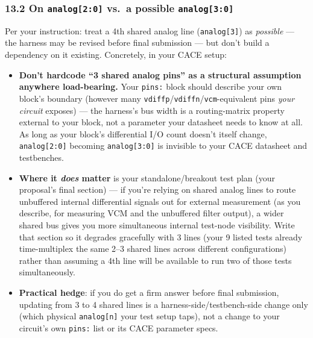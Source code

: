 \documentclass[
]{article}
\providecommand{\tightlist}{%
  \setlength{\itemsep}{0pt}\setlength{\parskip}{0pt}}
\begin{document}
\hypertarget{on-analog20-vs.-a-possible-analog30}{%
\subsubsection{\texorpdfstring{13.2 On \texttt{analog{[}2:0{]}} vs.~a
possible
\texttt{analog{[}3:0{]}}}{13.2 On analog{[}2:0{]} vs.~a possible analog{[}3:0{]}}}\label{on-analog20-vs.-a-possible-analog30}}

Per your instruction: treat a 4th shared analog line
(\texttt{analog{[}3{]}}) as \emph{possible} --- the harness may be
revised before final submission --- but don't build a dependency on it
existing. Concretely, in your CACE setup:

\begin{itemize}
\tightlist
\item
  \textbf{Don't hardcode ``3 shared analog pins'' as a structural
  assumption anywhere load-bearing.} Your \texttt{pins:} block should
  describe your own block's boundary (however many
  \texttt{vdiffp}/\texttt{vdiffn}/\texttt{vcm}-equivalent pins
  \emph{your circuit} exposes) --- the harness's bus width is a
  routing-matrix property external to your block, not a parameter your
  datasheet needs to know at all. As long as your block's differential
  I/O count doesn't itself change, \texttt{analog{[}2:0{]}} becoming
  \texttt{analog{[}3:0{]}} is invisible to your CACE datasheet and
  testbenches.
\item
  \textbf{Where it \emph{does} matter} is your standalone/breakout test
  plan (your proposal's final section) --- if you're relying on shared
  analog lines to route unbuffered internal differential signals out for
  external measurement (as you describe, for measuring VCM and the
  unbuffered filter output), a wider shared bus gives you more
  simultaneous internal test-node visibility. Write that section so it
  degrades gracefully with 3 lines (your 9 listed tests already
  time-multiplex the same 2--3 shared lines across different
  configurations) rather than assuming a 4th line will be available to
  run two of those tests simultaneously.
\item
  \textbf{Practical hedge}: if you do get a firm answer before final
  submission, updating from 3 to 4 shared lines is a
  harness-side/testbench-side change only (which physical
  \texttt{analog{[}n{]}} your test setup taps), not a change to your
  circuit's own \texttt{pins:} list or its CACE parameter specs.
\end{itemize}
\end{document}
